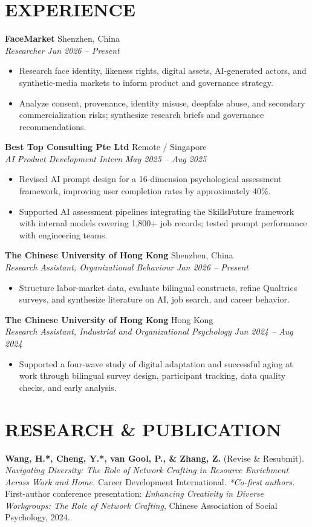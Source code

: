 \documentclass[10pt]{article}
\newcommand{\entry}[4]{%
  \textbf{#1} \hfill {#2}\\
  \textit{#3} \hfill \textit{#4}\\[-4pt]
}
\begin{document}
\section*{EXPERIENCE}
\entry{FaceMarket}{Shenzhen, China}{Researcher}{Jun 2026 -- Present}
\begin{itemize}
  \item Research face identity, likeness rights, digital assets, AI-generated actors, and synthetic-media markets to inform product and governance strategy.
  \item Analyze consent, provenance, identity misuse, deepfake abuse, and secondary commercialization risks; synthesize research briefs and governance recommendations.
\end{itemize}
\entry{Best Top Consulting Pte Ltd}{Remote / Singapore}{AI Product Development Intern}{May 2025 -- Aug 2025}
\begin{itemize}
  \item Revised AI prompt design for a 16-dimension psychological assessment framework, improving user completion rates by approximately 40\%.
  \item Supported AI assessment pipelines integrating the SkillsFuture framework with internal models covering 1,800+ job records; tested prompt performance with engineering teams.
\end{itemize}
\entry{The Chinese University of Hong Kong}{Shenzhen, China}{Research Assistant, Organizational Behaviour}{Jan 2026 -- Present}
\begin{itemize}
  \item Structure labor-market data, evaluate bilingual constructs, refine Qualtrics surveys, and synthesize literature on AI, job search, and career behavior.
\end{itemize}
\entry{The Chinese University of Hong Kong}{Hong Kong}{Research Assistant, Industrial and Organizational Psychology}{Jun 2024 -- Aug 2024}
\begin{itemize}
  \item Supported a four-wave study of digital adaptation and successful aging at work through bilingual survey design, participant tracking, data quality checks, and early analysis.
\end{itemize}

\section*{RESEARCH \& PUBLICATION}
\textbf{Wang, H.*, Cheng, Y.*, van Gool, P., \& Zhang, Z.} (Revise \& Resubmit). \textit{Navigating Diversity: The Role of Network Crafting in Resource Enrichment Across Work and Home.} Career Development International. \textit{*Co-first authors.}\\[3pt]
First-author conference presentation: \textit{Enhancing Creativity in Diverse Workgroups: The Role of Network Crafting}, Chinese Association of Social Psychology, 2024.
\end{document}

